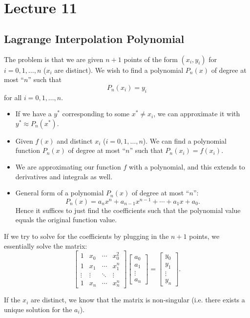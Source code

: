 \documentclass[class=article, crop=false]{standalone}
\begin{document}
  \section{Lecture 11}
  \subsection{Lagrange Interpolation Polynomial}
  The problem is that we are given $n + 1$ points of the form $(x_i, y_i)$ for $i = 0,1,\dotsc,n$ ($x_i$ are distinct). We wish to find a polynomial $P_n(x)$ of degree at most ``$n$'' such that
  \[
    P_n(x_i) = y_i
  \]
  for all $i = 0,1,\dotsc,n$.
  \begin{itemize}
    \item If we have a $y^*$ corresponding to some $x^*\neq x_i$, we can approximate it with $y^*\approx P_n(x^*)$.
    \item Given $f(x)$ and distinct $x_i$ ($i = 0,1,\dotsc,n$). We can find a polynomial function $P_n(x)$ of degree at most ``$n$'' such that $P_n(x_i) = f(x_i)$.
    \item We are approximating our function $f$ with a polynomial, and this extends to derivatives and integrals as well.
    \item General form of a polynomial $P_n(x)$ of degree at most ``$n$'':
    \[
      P_n(x) = a_nx^n + a_{n - 1}x^{n - 1} + \dotsb + a_1x + a_0.
    \]
    Hence it suffices to just find the coefficients such that the polynomial value equals the original function value.
  \end{itemize}
  If we try to solve for the coefficients by plugging in the $n + 1$ points, we essentially solve the matrix:
  \[
  \begin{bmatrix}
    1 & x_0 & \dotsb & x_0^2 \\
    1 & x_1 & \dotsb & x_1^n \\
    \vdots & \vdots & \ddots & \vdots \\
    1 & x_n & \dotsb & x_n^n
  \end{bmatrix}
  \begin{bmatrix}
    a_0 \\
    a_1 \\
    \vdots \\
    a_n
  \end{bmatrix} = 
  \begin{bmatrix}
    y_0 \\
    y_1 \\
    \vdots \\
    y_n
  \end{bmatrix}.
  \]
  \begin{note}{}
    If the $x_i$ are distinct, we know that the matrix is non-singular (i.e. there exists a unique solution for the $a_i$).
  \end{note}
\end{document}
